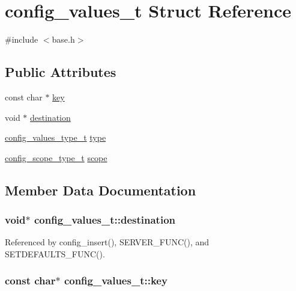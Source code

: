 \hypertarget{structconfig__values__t}{\section{config\-\_\-values\-\_\-t Struct Reference}
\label{structconfig__values__t}
}


{\ttfamily \#include $<$base.\-h$>$}

\subsection*{Public Attributes}
\begin{DoxyCompactItemize}
\item 
const char $\ast$ \hyperlink{structconfig__values__t_a698f29c6fb2f085d94bb445cca9f4b57}{key}
\item 
void $\ast$ \hyperlink{structconfig__values__t_a9a8779935769fd62e260691843e93cfd}{destination}
\item 
\hyperlink{base_8h_a79a880fdca5e2f89f0c7deba59cfa7fb}{config\-\_\-values\-\_\-type\-\_\-t} \hyperlink{structconfig__values__t_aad0d4f1c7bef4a3c3df223c6f7dff2cc}{type}
\item 
\hyperlink{base_8h_a909d47eef1da468e4e0f0f29aab87fca}{config\-\_\-scope\-\_\-type\-\_\-t} \hyperlink{structconfig__values__t_ae97d567f5b8c756a90ee74d85eced857}{scope}
\end{DoxyCompactItemize}


\subsection{Member Data Documentation}
\hypertarget{structconfig__values__t_a9a8779935769fd62e260691843e93cfd}{
\subsubsection[{destination}]{\setlength{\rightskip}{0pt plus 5cm}void$\ast$ config\-\_\-values\-\_\-t\-::destination}}\label{structconfig__values__t_a9a8779935769fd62e260691843e93cfd}


Referenced by config\-\_\-insert(), S\-E\-R\-V\-E\-R\-\_\-\-F\-U\-N\-C(), and S\-E\-T\-D\-E\-F\-A\-U\-L\-T\-S\-\_\-\-F\-U\-N\-C().

\hypertarget{structconfig__values__t_a698f29c6fb2f085d94bb445cca9f4b57}{
\subsubsection[{key}]{\setlength{\rightskip}{0pt plus 5cm}const char$\ast$ config\-\_\-values\-\_\-t\-::key}}\label{structconfig__values__t_a698f29c6fb2f085d94bb445cca9f4b57}


